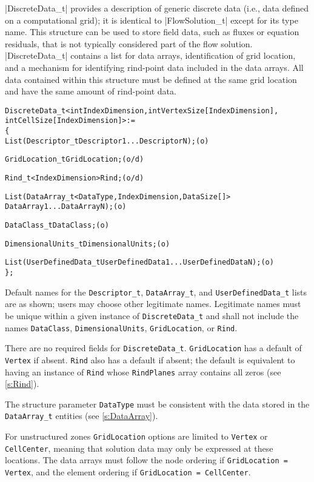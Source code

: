 |DiscreteData_t| provides a description of generic discrete data (i.e.,
data defined on a computational grid); it is identical to
|FlowSolution_t| except for its type name.
This structure can be used to store field data, such as fluxes or
equation residuals, that is not typically considered part of the flow
solution.
|DiscreteData_t| contains a list for data arrays, identification of
grid location, and a mechanism for identifying rind-point data included
in the data arrays.
All data contained within this structure must be defined at the same
grid location and have the same amount of rind-point data.
\begin{alltt}
  DiscreteData\_t< int IndexDimension, int VertexSize[IndexDimension], 
                  int CellSize[IndexDimension] > :=
    \{
    List( Descriptor\_t Descriptor1 ... DescriptorN ) ;                      (o)

    GridLocation\_t GridLocation ;                                           (o/d)

    Rind\_t<IndexDimension> Rind ;                                           (o/d)

    List( DataArray\_t<DataType, IndexDimension, DataSize[]> 
          DataArray1 ... DataArrayN ) ;                                     (o)

    DataClass\_t DataClass ;                                                 (o)
    
    DimensionalUnits\_t DimensionalUnits ;                                   (o)

    List( UserDefinedData\_t UserDefinedData1 ... UserDefinedDataN ) ;       (o)
    \} ;
\end{alltt}

\begin{notes}
\item Default names for the \texttt{Descriptor\_t},
      \texttt{DataArray\_t}, and \texttt{UserDefinedData\_t} lists are
      as shown; users may choose other legitimate names.
      Legitimate names must be unique within a given instance
      of \texttt{DiscreteData\_t} and shall not include the
      names \texttt{DataClass}, \texttt{DimensionalUnits},
      \texttt{GridLocation}, or \texttt{Rind}.
\item There are no required fields for \texttt{DiscreteData\_t}.
      \texttt{GridLocation} has a default of \texttt{Vertex} if absent.
      \texttt{Rind} also has a default if absent; the default
      is equivalent to having an instance of \texttt{Rind}
      whose \texttt{RindPlanes} array contains all zeros (see
      \autoref{s:Rind}).
\item The structure parameter \texttt{DataType} must be consistent
      with the data stored in the \texttt{DataArray\_t} entities (see
      \autoref{s:DataArray}).
\item For unstructured zones \texttt{GridLocation} options are limited
      to \texttt{Vertex} or \texttt{CellCenter}, meaning that solution
      data may only be expressed at these locations.
      The data arrays must follow the node ordering
      if \texttt{GridLocation = Vertex}, and the element ordering if
      \texttt{GridLocation = CellCenter}.
\end{notes}

